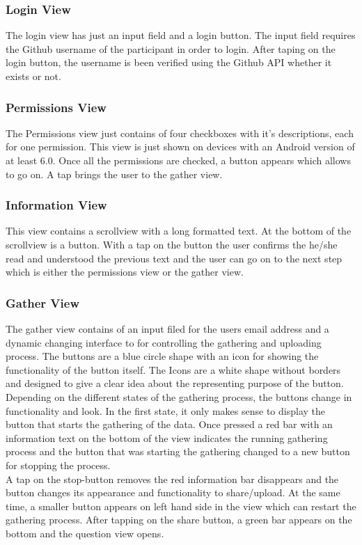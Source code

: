 \subsubsection{Login View}
The login view has just an input field and a login button. The input field requires the Github username of the participant in order to login. After taping on the login button, the username is been verified using the Github API whether it exists or not. 

\subsubsection{Permissions View}
The Permissions view just contains of four checkboxes with it's descriptions, each for one permission. This view is just shown on devices with an Android version of at least 6.0. 
Once all the permissions are checked, a button appears which allows to go on. A tap brings the user to the gather view.

\subsubsection{Information View}
This view contains a scrollview with a long formatted text. At the bottom of the scrollview is a button. With a tap on the button the user confirms the he/she read and understood the previous text and the user can go on to the next step which is either the permissions view or the gather view. 

\subsubsection{Gather View}
The gather view contains of an input filed for the users email address and a dynamic changing interface to for controlling the gathering and uploading process. The buttons are a blue circle shape with an icon for showing the functionality of the button itself. The Icons are a white shape without borders and designed to give a clear idea about the representing purpose of the button. 
Depending on the different states of the gathering process, the buttons change in functionality and look. In the first state, it only makes sense to display the button that starts the gathering of the data. Once pressed a red bar with an information text on the bottom of the view indicates the running gathering process and the button that was starting the gathering changed to a new button for stopping the process.\\
A tap on the stop-button removes the red information bar disappears and the button changes its appearance and functionality to share/upload.
At the same time, a smaller button appears on left hand side in the view which can restart the gathering process. 
After tapping on the share button, a green bar appears on the bottom and the question view opens. 

